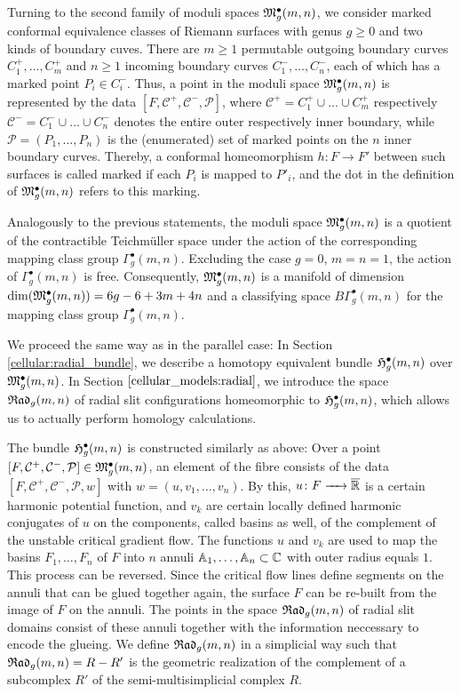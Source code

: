 Turning to the second family of moduli spaces $\mathfrak{M}^\bullet_g(m, n)$,
we consider marked conformal equivalence classes of Riemann surfaces with genus $g \ge 0$ and two kinds of boundary cuves.
There are $m \geq 1$ permutable outgoing boundary curves $C^+_1, \dotsc, C^+_m$ 
and $n \geq 1$ incoming boundary curves $C^-_1, \dotsc, C^-_n$, each of which has a marked point $P_i \in C^-_i$.
Thus, a point in the moduli space $\mathfrak{M}^\bullet_g(m, n)$ is represented by the data $[F, \mathcal C^+, \mathcal C^-, \mathcal P]$,
where $\mathcal C^+ = C^+_1 \cup \dotsc \cup C^+_m$ respectively $\mathcal C^- = C^-_1 \cup \dotsc \cup C^-_n$ denotes the entire outer respectively inner boundary,
while $\mathcal P = (P_1, \dotsc, P_n)$ is the (enumerated) set of marked points on the $n$ inner boundary curves.
Thereby, a conformal homeomorphism $h \colon F \to F'$ between such surfaces is called marked if each $P_i$ is mapped to $P'_i$,
and the dot in the definition of $\mathfrak{M}^\bullet_g(m, n)$ refers to this marking.

Analogously to the previous statements,
the moduli space $\mathfrak{M}^\bullet_g(m, n)$ is a quotient of the contractible Teichmüller space 
under the action of the corresponding mapping class group $\Gamma^\bullet_g(m, n)$.
Excluding the case $g = 0$, $m = n = 1$, the action of $\Gamma^\bullet_g(m, n)$ is free.
Consequently, $\mathfrak{M}^\bullet_g(m, n)$ is a manifold of dimension $\dim(\mathfrak{M}^\bullet_g(m, n)) = 6g-6+3m+4n$
and a classifying space $B \Gamma^\bullet_g(m, n)$ for the mapping class group $\Gamma^\bullet_g(m, n)$.

We proceed the same way as in the parallel case: 
In Section \ref{cellular:radial_bundle}, we describe a homotopy equivalent bundle $\mathfrak{H}^{\bullet}_g(m, n)$ over $\mathfrak{M}^\bullet_g(m, n)$.
In Section $\ref{cellular_models:radial}$, we introduce the space ${\mathfrak{Rad}_g(m,n)}$ of radial slit configurations homeomorphic to $\mathfrak{H}^{\bullet}_g(m, n)$,
which allows us to actually perform homology calculations.

The bundle $\mathfrak{H}^{\bullet}_g(m, n)$ is constructed similarly as above:
Over a point $[F, \mathcal C^+, \mathcal C^-, \mathcal P] \in \mathfrak{M}^\bullet_g(m, n)$, an element of the fibre consists of the data $[F, \mathcal C^+, \mathcal C^-, \mathcal P, w]$ 
with $w = (u, v_1, \dotsc, v_n)$.
By this, $u \colon F \xrightarrow{\hspace{6pt}{}\hspace{6pt}} \overline{\mathbb R}$ is a certain harmonic potential function,
and $v_k$ are certain locally defined harmonic conjugates of $u$ on the components, called basins as well, of the complement of the unstable critical gradient flow.
The functions $u$ and $v_k$ are used to map the basins $F_1, \dotsc, F_n$ of $F$ into $n$ annuli $\mathbb A_1, \dotsc, \mathbb A_n \subset \mathbb C$ with outer radius equals $1$.
This process can be reversed.
Since the critical flow lines define segments on the annuli that can be glued together again, the surface $F$ can be re-built from the image of $F$ on the annuli.
The points in the space ${\mathfrak{Rad}_g(m,n)}$ of radial slit domains consist of these annuli together with the information neccessary to encode the glueing.
We define ${\mathfrak{Rad}_g(m,n)}$ in a simplicial way
such that ${\mathfrak{Rad}_g(m,n)} = R - R'$ is the geometric realization of the complement of a subcomplex $R'$ of the semi-multisimplicial complex $R$.

